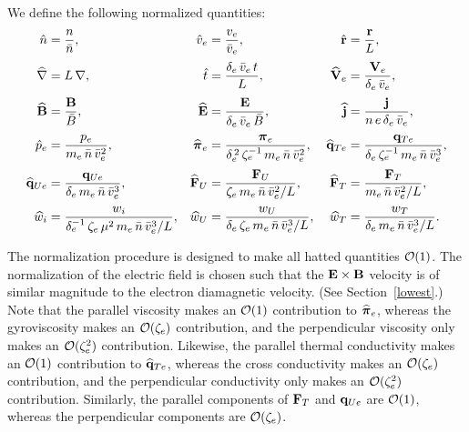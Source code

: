 \documentclass[notitlepage,12pt]{article}
\newcommand{\bpi}{\mbox{\boldmath$\pi$}}
\begin{document}
 We
define the following normalized quantities: {\small
\begin{align}
\hat{n} &= \frac{n}{\bar{n}},&
\hat{v}_e &= \frac{v_e}{\bar{v}_e}, &
\hat{\bf r} &= \frac{{\bf r}}{ L},\nonumber\\[0.5ex]
\widehat{\nabla} &= L\,\nabla, &
\hat{t} &= \frac{\delta_e\,\bar{v}_e\,t}{L}, &
\widehat{\bf V}_e &= \frac{{\bf V}_e}{\delta_e\,\bar{v}_e}, \nonumber\\[0.5ex]
\widehat{\bf B}&= \frac{{\bf B}}{\bar{B}}, &
\widehat{\bf E}& = \frac{{\bf E}}{ \delta_e\,\bar{v}_e\,\bar{B}},&
\widehat{\bf j}& =\frac{{\bf j} }{n\,e\,\delta_e\,\bar{v}_e}, \nonumber\\[0.5ex]
\hat{p}_e &= \frac{p_e}{m_e\,\bar{n}\,\bar{v}_e^{2}}, &
\widehat{\bpi}_e&= \frac{\bpi_e}{\delta_e^{\,2}\,\zeta_e^{-1}\,m_e\,\bar{n}\,\bar{v}_e^{2}}, &
\widehat{\bf q}_{Te}& = \frac{{\bf q}_{Te} }{ \delta_e\,\zeta_e^{-1}\,m_e\,\bar{n}\,\bar{v}_e^{3}}, \nonumber\\[0.5ex]
\widehat{\bf q}_{Ue} &= \frac{{\bf q}_{Ue} }{\delta_e\,m_e\,\bar{n}\,\bar{v}_e^{3}}, &
\widehat{\bf F}_U &= \frac{{\bf F}_U}{\zeta_e\,m_e\,\bar{n}\,\bar{v}_e^{2}/L}, &
\widehat{\bf F}_T &= \frac{{\bf F}_T}{m_e\,\bar{n}\,\bar{v}_e^{2}/L},\nonumber\\[0.5ex]
\widehat{w}_i &= \frac{w_i}{\delta_e^{-1}\,\zeta_e\,\mu^2\, m_e\,\bar{n}\,\bar{v}_e^{3}/L},&
\widehat{w}_U &= \frac{w_U}{\delta_e\,\zeta_e\, m_e\,\bar{n}\,\bar{v}_e^{3}/L},&
\widehat{w}_T &= \frac{w_T}{\delta_e\, m_e\,\bar{n}\,\bar{v}_e^{3}/L}.\nonumber
\end{align}}

The normalization procedure is designed to make all hatted quantities ${\cal O}(1)$.
The normalization of the electric field is chosen 
 such that the ${\bf E}\times{\bf B}$
velocity is of  similar magnitude to the electron diamagnetic velocity.  (See Section~\ref{lowest}.) Note that the parallel viscosity
makes an ${\cal O}(1)$ contribution to $\widehat{\bpi}_e$, whereas the gyroviscosity
makes an ${\cal O}(\zeta_e)$ contribution, and the perpendicular viscosity only 
makes an ${\cal O}(\zeta_e^{2})$ contribution. Likewise, the parallel thermal
conductivity 
makes an ${\cal O}(1)$ contribution to $\widehat{\bf q}_{Te}$, whereas the cross
conductivity 
makes an ${\cal O}(\zeta_e)$ contribution, and the perpendicular conductivity only 
makes an ${\cal O}(\zeta_e^{2})$ contribution. Similarly, the parallel components
of ${\bf F}_T$ and ${\bf q}_{Ue}$ are ${\cal O}(1)$, whereas the perpendicular
components are ${\cal O}(\zeta_e)$. 
\end{document}
